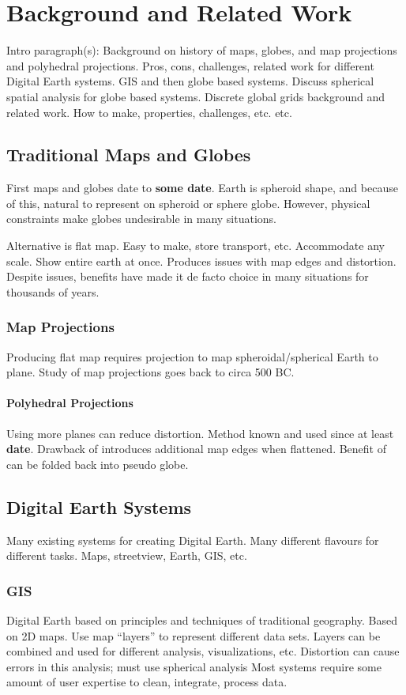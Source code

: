 \chapter{Background and Related Work} \label{chap:background}
Intro paragraph(s):
Background on history of maps, globes, and map projections and polyhedral projections.
Pros, cons, challenges, related work for different Digital Earth systems.
GIS and then globe based systems.
Discuss spherical spatial analysis for globe based systems.
Discrete global grids background and related work.
How to make, properties, challenges, etc. etc.


\section{Traditional Maps and Globes}
First maps and globes date to \textbf{some date}.
Earth is spheroid shape, and because of this, natural to represent on spheroid or sphere globe.
However, physical constraints make globes undesirable in many situations.


Alternative is flat map.
Easy to make, store transport, etc.
Accommodate any scale.
Show entire earth at once.
Produces issues with map edges and distortion.
Despite issues, benefits have made it de facto choice in many situations for thousands of years.


\subsection{Map Projections}
Producing flat map requires projection to map spheroidal/spherical Earth to plane.
Study of map projections goes back to circa 500 BC.


\subsubsection{Polyhedral Projections}
Using more planes can reduce distortion.
Method known and used since at least \textbf{date}.
Drawback of introduces additional map edges when flattened.
Benefit of can be folded back into pseudo globe.


\section{Digital Earth Systems}
Many existing systems for creating Digital Earth.
Many different flavours for different tasks.
Maps, streetview, Earth, GIS, etc.


\subsection{GIS}
Digital Earth based on principles and techniques of traditional geography.
Based on 2D maps.
Use map ``layers'' to represent different data sets.
Layers can be combined and used for different analysis, visualizations, etc.
Distortion can cause errors in this analysis; must use spherical analysis
Most systems require some amount of user expertise to clean, integrate, process data.


